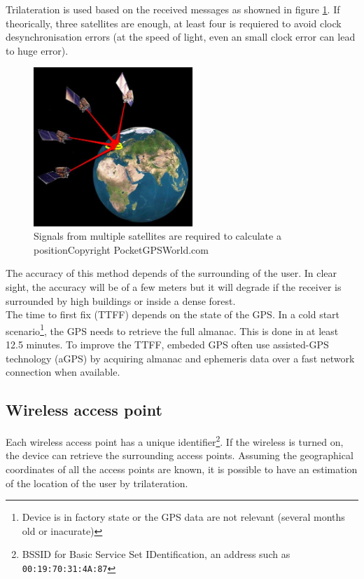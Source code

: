Trilateration is used based on the received messages as showned in figure \ref{fig:gps-earth}.
If theorically, three satellites are enough, at least four is requiered to avoid clock desynchronisation errors (at the speed of light, even an small clock error can lead to huge error).\\

\begin{figure}[h]
  \centering
  \includegraphics[width=6cm]{images/gps.jpg}
  \caption{Signals from multiple satellites are required to calculate a position\newline Copyright PocketGPSWorld.com}
  \label{fig:gps-earth}
\end{figure}


The accuracy of this method depends of the surrounding of the user.
In clear sight, the accuracy will be of a few meters but it will degrade if the receiver is surrounded by high buildings or inside a dense forest.\\

The time to first fix (TTFF) depends on the state of the GPS.
In a cold start scenario\footnote{Device is in factory state or the GPS data are not relevant (several months old or inacurate)}, the GPS needs to retrieve the full almanac.
This is done in at least 12.5 minutes\cite{gpsuser}.
To improve the TTFF, embeded GPS often use assisted-GPS technology (aGPS) by acquiring almanac and ephemeris data over a fast network connection when available.

\subsection{Wireless access point}
Each wireless access point has a unique identifier\footnote{BSSID for Basic Service Set IDentification, an address such as \texttt{00:19:70:31:4A:87}}.
If the wireless is turned on, the device can retrieve the surrounding access points.
Assuming the geographical coordinates of all the access points are known, it is possible to have an estimation of the location of the user by trilateration.\\

